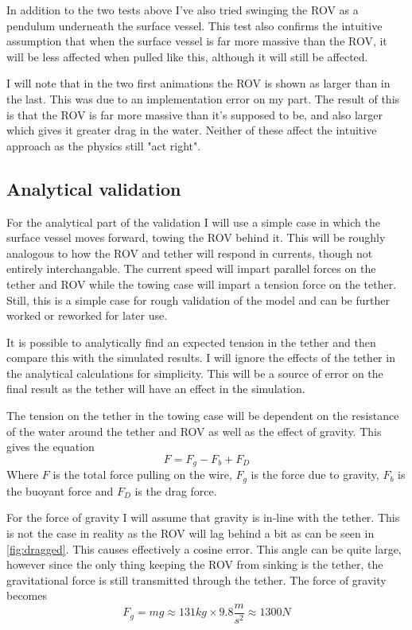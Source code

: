 In addition to the two tests above I've also tried swinging the ROV as a pendulum underneath the surface vessel. This test also confirms the intuitive assumption that when the surface vessel is far more massive than the ROV, it will be less affected when pulled like this, although it will still be affected. 

I will note that in the two first animations the ROV is shown as larger than in the last. This was due to an implementation error on my part. The result of this is that the ROV is far more massive than it's supposed to be, and also larger which gives it greater drag in the water. Neither of these affect the intuitive approach as the physics still "act right". 

\subsection{Analytical validation}
\label{sec:anal}
For the analytical part of the validation I will use a simple case in which the surface vessel moves forward, towing the ROV behind it. This will be roughly analogous to how the ROV and tether will respond in currents, though not entirely interchangable. The current speed will impart parallel forces on the tether and ROV while the towing case will impart a tension force on the tether. Still, this is a simple case for rough validation of the model and can be further worked or reworked for later use.

It is possible to analytically find an expected tension in the tether and then compare this with the simulated results. I will ignore the effects of the tether in the analytical calculations for simplicity. This will be a source of error on the final result as the tether will have an effect in the simulation.

The tension on the tether in the towing case will be dependent on the resistance of the water around the tether and ROV as well as the effect of gravity. This gives the equation 
\[F = F_g - F_b + F_D\]
Where \(F\) is the total force pulling on the wire, \(F_g\) is the force due to gravity, \(F_b\) is the buoyant force and \(F_D\) is the drag force. 

For the force of gravity I will assume that gravity is in-line with the tether. This is not the case in reality as the ROV will lag behind a bit as can be seen in \cref{fig:dragged}. This causes effectively a cosine error. This angle can be quite large, however since the only thing keeping the ROV from sinking is the tether, the gravitational force is still transmitted through the tether. The force of gravity becomes
\[F_g = m g \approx 131kg \times 9.8\frac{m}{s^2} \approx 1300N\] 

